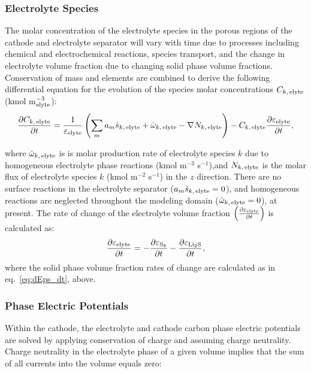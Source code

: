 \documentclass{elsarticle}
\begin{document}
\subsubsection{Electrolyte Species}
The molar concentration of the electrolyte species in the porous regions of the cathode and electrolyte separator will vary with time due to processes including chemical and electrochemical reactions, species transport, and the change in electrolyte volume fraction due to changing solid phase volume fractions. Conservation of mass and elements are combined to derive the following differential equation for the evolution of the species molar concentrations $C_{k,\,{\rm elyte}}$  (kmol m$_{\rm elyte}^{-3}$):
\begin{equation}\label{eq:dCkelyte_dt}
    \frac{\partial C_{k,\,{\rm elyte}}}{\partial t} = \frac{1}{\varepsilon_{\rm elyte}}\left(\sum_m a_m\dot{s}_{k,\,{\rm elyte}} + \dot{\omega}_{k,\,{\rm elyte}} - \nabla N_{k,\,{\rm elyte}}\right) - C_{k,\,{\rm elyte}}\frac{\partial \varepsilon_{\rm elyte}}{\partial t},
\end{equation}

where $\dot{\omega}_{k,\,{\rm elyte}}$ is is molar production rate of electrolyte species $k$ due to homogeneous electrolyte phase reactions (kmol m$^{-3}$ s$^{-1}$),and $N_{k,\,{\rm elyte}}$ is the molar flux of electrolyte species $k$ (kmol m$^{-2}$ s$^{-1}$) in the $z$ direction. There are no surface reactions in the electrolyte separator ($a_m\dot{s}_{k,\,{\rm elyte}} = 0$), and homogeneous reactions are neglected throughout the modeling domain ($\dot{\omega}_{k,\,{\rm elyte}}=0$), at present. The rate of change of the electrolyte volume fraction $\left(\frac{\partial \varepsilon_{\rm elyte}}{\partial t}\right)$ is calculated as:
\begin{equation}\label{eq:dEpsElyte_dt}
    \frac{\partial \varepsilon_{\rm elyte}}{\partial t} = -\frac{\partial \varepsilon_{\rm S_8}}{\partial t} -\frac{\partial \varepsilon_{\rm Li_2S}}{\partial t},
\end{equation}
where the solid phase volume fraction rates of change are calculated as in eq.~\ref{eq:dEps_dt}, above.

\subsubsection{Phase Electric Potentials}
 Within the cathode, the electrolyte and cathode carbon phase electric potentials are solved by applying conservation of charge and assuming charge neutrality. Charge neutrality in the electrolyte phase of a given volume implies that the sum of all currents into the volume equals zero:
\end{document}
